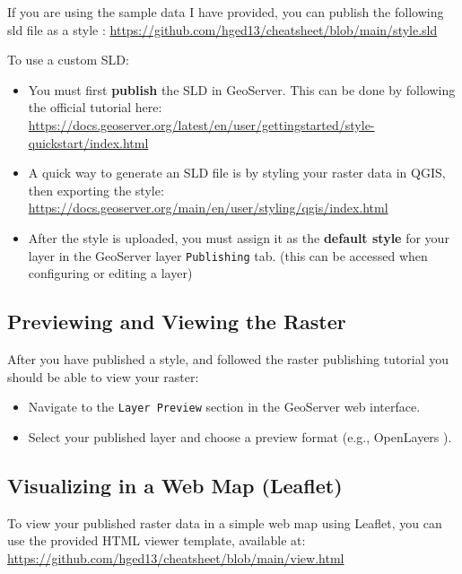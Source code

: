 \documentclass{article}
\begin{document}
If you are using the sample data I have provided, you can publish the following sld file as a style : \url{https://github.com/hged13/cheatsheet/blob/main/style.sld}

To use a custom SLD:

\begin{itemize}
  \item You must first \textbf{publish} the SLD in GeoServer. This can be done by following the official tutorial here:  
  \url{https://docs.geoserver.org/latest/en/user/gettingstarted/style-quickstart/index.html}
  
  \item A quick way to generate an SLD file is by styling your raster data in QGIS, then exporting the style:  
  \url{https://docs.geoserver.org/main/en/user/styling/qgis/index.html}
  
  \item After the style is uploaded, you must assign it as the \textbf{default style} for your layer in the GeoServer layer \texttt{Publishing} tab. (this can be accessed when configuring or editing a layer)
\end{itemize}

\subsection*{Previewing and Viewing the Raster}

After you have published a style, and followed the raster publishing tutorial you should be able to view your raster:

\begin{itemize}
  \item Navigate to the \texttt{Layer Preview} section in the GeoServer web interface.
  \item Select your published layer and choose a preview format (e.g., OpenLayers ).
\end{itemize}

\subsection*{Visualizing in a Web Map (Leaflet)}

To view your published raster data in a simple web map using Leaflet, you can use the provided HTML viewer template, available at:   \\
\url{https://github.com/hged13/cheatsheet/blob/main/view.html}\\
\end{document}
